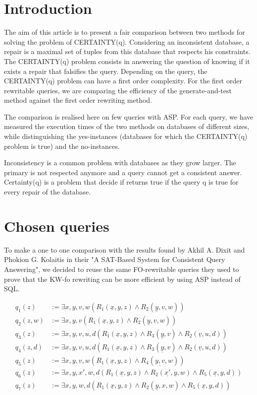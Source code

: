 \documentclass[acmsmall]{acmart}
\begin{document}
\begin{CCSXML}
\newpage


\section{Introduction}
The aim of this article is to present a fair comparison between two methods for
solving the problem of CERTAINTY(q). Considering an inconsistent database, a
repair is a maximal set of tuples from this database that respects his
constraints. The CERTAINTY(q) problem consists in answering the question of
knowing if it exists a repair that falsifies the query. Depending on the query,
the CERTAINTY(q) problem can have a first order complexity. For the first order
rewritable queries, we are comparing the efficiency of the generate-and-test
method against the first order rewriting method.

The comparison is realised here on few queries with ASP. For each query, we
have measured the execution times of the two methods on databases of different
sizes, while distinguishing the yes-instances (databases for which the
CERTAINTY(q) problem is true) and the no-instances.

	Inconsistency is a common problem with databases as they grow larger. The primary is not respected anymore and a query cannot get a consistent answer. Certainty(q) is a problem that decide if returns true if the query q is true for every repair of the database.




\section{Chosen queries}

To make a one to one comparison with the results found by Akhil A. Dixit and
Phokion G. Kolaitis in their "A SAT-Based System for Consistent Query
Answering", we decided to reuse the same FO-rewritable queries they used to
prove that the KW-fo rewriting can be more efficient by using ASP instead of
SQL.

\begin{align*}
	q_1(z)   &:= \exists x,y,v,w (R_1(\underline{x},y,z) \wedge R_2(\underline{y}, v, w))\\
	q_2(z,w) &:= \exists x,y,v (R_1(\underline{x},y,z) \wedge R_2(\underline{y},v,w))\\
	q_3(z)   &:= \exists x,y,v,u,d (R_1(\underline{x},y,z) \wedge R_3(\underline{y},v) \wedge R_2(\underline{v},u,d))\\
	q_4(z,d) &:= \exists x,y,v,u,d (R_1(\underline{x},y,z) \wedge R_3(\underline{y},v) \wedge R_2(\underline{v},u,d))\\
	q_5(z)   &:= \exists x,y,v,w (R_1(\underline{x},y,z) \wedge R_4(\underline{y,v},w))\\
	q_6(z)   &:= \exists x,y,x',w,d (R_1(\underline{x},y,z) \wedge R_2(\underline{x'},y,w) \wedge R_5(\underline{x},y,d))\\
	q_7(z)   &:= \exists x,y,w,d (R_1(\underline{x},y,z) \wedge R_2(\underline{y},x,w) \wedge R_5(\underline{x},y,d))\\
\end{align*}



\end{CCSXML}
\end{document}

